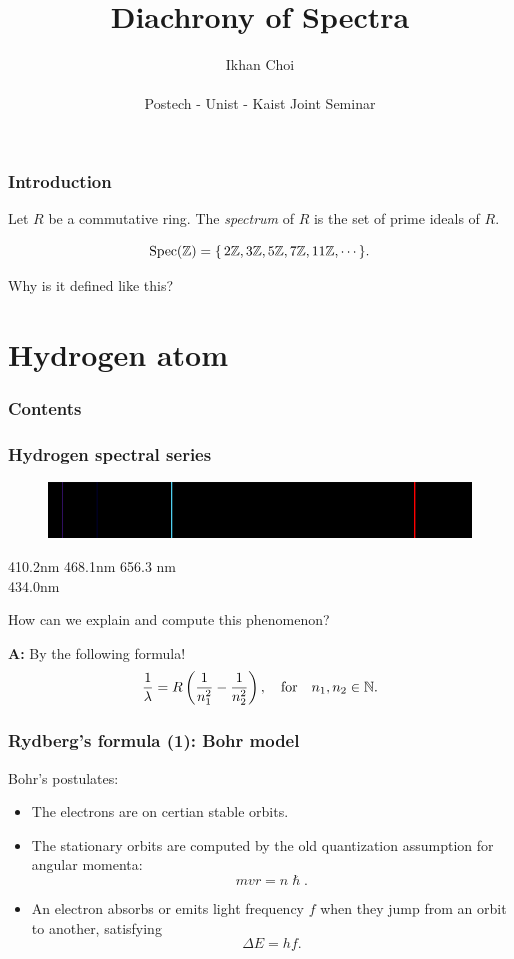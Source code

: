 \documentclass[10pt]{beamer}
\title{Diachrony of Spectra}
\author{Ikhan Choi \\ \quad \\ Postech - Unist - Kaist Joint Seminar}
\begin{document}
\maketitle

\begin{frame}
\frametitle{Introduction}
  \pause
  \begin{defn}
    Let $R$ be a commutative ring.
    The \emph{spectrum} of $R$ is the set of prime ideals of $R$.
  \end{defn}
  \pause
  \begin{ex}
  	\[\operatorname{Spec}(\mathbb{Z})=\{\,2\mathbb{Z},3\mathbb{Z},5\mathbb{Z},7\mathbb{Z},11\mathbb{Z},\cdots\,\}.\]
  \end{ex}
  \pause
  \begin{qn}
    Why is it defined like this?
  \end{qn}
\end{frame}


\section{Hydrogen atom}
\begin{frame}
\frametitle{Contents}
  \tableofcontents[currentsection]
\end{frame}

\begin{frame}
\frametitle{Hydrogen spectral series}
  \begin{figure}\includegraphics[scale=.4]{emission.png}\end{figure}
  \pause 410.2nm \hspace{3em} 468.1nm \hspace{13em} 656.3 nm\\ \hspace{2em} 434.0nm\\
  \bigskip
  \pause
  \begin{qn}
    How can we explain and compute this phenomenon?
  \end{qn}
  \pause \textbf{A:} By the following formula!
  \[\frac1\lambda=R\left(\frac1{n_1^2}-\frac1{n_2^2}\right),\quad\text{for}\quad n_1,n_2\in\mathbb{N}.\]
\end{frame}

\begin{frame}
\frametitle{Rydberg's formula (1): Bohr model}
  Bohr's postulates:\pause
  \begin{itemize}[<+->]
    \item The electrons are on certian stable orbits.
    \item The stationary orbits are computed by the old quantization assumption for angular momenta:
    \[mvr=n\hslash.\]
    \item An electron absorbs or emits light frequency $f$ when they jump from an orbit to another, satisfying
    \[\Delta E=hf.\]
  \end{itemize}
\end{frame}
\end{document}
